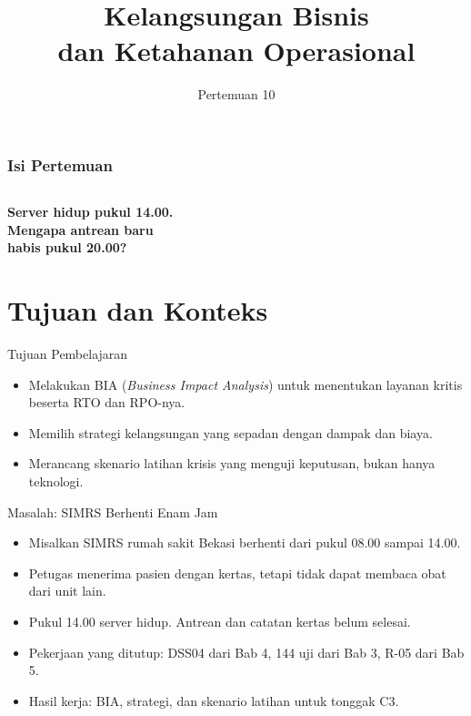 \documentclass[aspectratio=169, table, 12pt]{beamer}
\title{\Huge Kelangsungan Bisnis\\ \vspace{10pt} dan Ketahanan Operasional}
\date{Pertemuan 10}
\begin{document}
\frame{\titlepage}

\begin{frame}
  \frametitle{Isi Pertemuan}
  \vspace{14pt}
  \begin{columns}[t]
    {\small\tableofcontents[sections={1-4}]}

    {\small\tableofcontents[sections={5-8}]}
  \end{columns}
\end{frame}

\begin{frame}{\hfill}
  \centering
  \Huge{\textbf{Server hidup pukul 14.00.\\Mengapa antrean baru\\habis pukul 20.00?}}
\end{frame}

\section{Tujuan dan Konteks}

\begin{frame}{{\Large Tujuan Pembelajaran}}
  \vspace{10pt}
  \begin{itemize}
    \item Melakukan BIA (\textit{Business Impact Analysis}) untuk menentukan layanan kritis beserta
          RTO dan RPO-nya.
    \item Memilih strategi kelangsungan yang sepadan dengan dampak dan biaya.
    \item Merancang skenario latihan krisis yang menguji keputusan, bukan hanya teknologi.
  \end{itemize}
\end{frame}

\begin{frame}{{\Large Masalah: SIMRS Berhenti Enam Jam}}
  \vspace{6pt}
  \small
  \begin{itemize}
    \item Misalkan SIMRS rumah sakit Bekasi berhenti dari pukul 08.00 sampai 14.00.
    \item Petugas menerima pasien dengan kertas, tetapi tidak dapat membaca obat dari unit lain.
    \item Pukul 14.00 server hidup. Antrean dan catatan kertas belum selesai.
    \item Pekerjaan yang ditutup: DSS04 dari Bab 4, 144 uji dari Bab 3, R-05 dari Bab 5.
    \item Hasil kerja: BIA, strategi, dan skenario latihan untuk tonggak C3.
  \end{itemize}
\end{frame}
\end{document}
